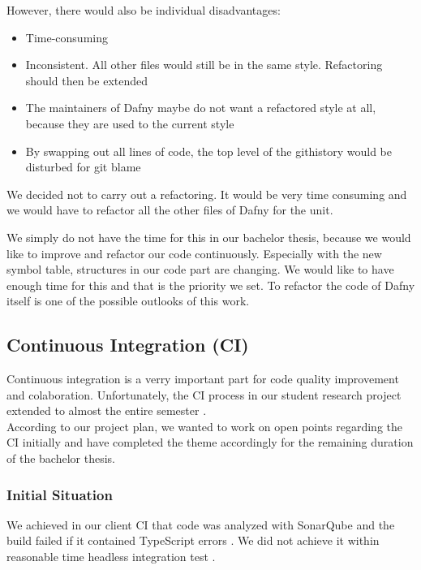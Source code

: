 However, there would also be individual disadvantages:
\begin{itemize}
    \item Time-consuming
    \item Inconsistent. All other files would still be in the same style. Refactoring should then be extended
    \item The maintainers of Dafny maybe do not want a refactored style at all, because they are used to the current style
    \item By swapping out all lines of code, the top level of the githistory would be disturbed for git blame
\end{itemize}

We decided not to carry out a refactoring.
It would be very time consuming and we would have to refactor all the other files of Dafny for the unit.

We simply do not have the time for this in our bachelor thesis,
because we would like to improve and refactor our code continuously.
Especially with the new symbol table, structures in our code part are changing.
We would like to have enough time for this and that is the priority we set.
To refactor the code of Dafny itself is one of the possible outlooks of this work.



\subsection{Continuous Integration (CI)}
Continuous integration is a verry important part for code quality improvement and colaboration.
Unfortunately, the CI process in our student research project extended to almost the entire semester \cite{sa}. \\

According to our project plan, we wanted to work on open points regarding the CI initially and have completed the theme accordingly for the remaining duration of the bachelor thesis.

\subsubsection{Initial Situation}
We achieved in our client CI that code was analyzed with SonarQube and the build failed if it contained TypeScript errors \cite{sa}.
We did not achieve it within reasonable time headless integration test \cite{sa}. \\

